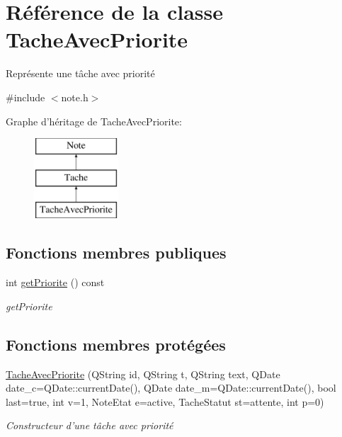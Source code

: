 \hypertarget{class_tache_avec_priorite}{\section{Référence de la classe Tache\-Avec\-Priorite}
\label{class_tache_avec_priorite}
}


Représente une tâche avec priorité  




{\ttfamily \#include $<$note.\-h$>$}

Graphe d'héritage de Tache\-Avec\-Priorite\-:\begin{figure}[H]
\begin{center}
\leavevmode
\includegraphics[height=3.000000cm]{class_tache_avec_priorite}
\end{center}
\end{figure}
\subsection*{Fonctions membres publiques}
\begin{DoxyCompactItemize}
\item 
int \hyperlink{class_tache_avec_priorite_ab932dc1d71765a1e124d2a398248ee6c}{get\-Priorite} () const 
\begin{DoxyCompactList}\small\item\em get\-Priorite \end{DoxyCompactList}\end{DoxyCompactItemize}
\subsection*{Fonctions membres protégées}
\begin{DoxyCompactItemize}
\item 
\hyperlink{class_tache_avec_priorite_a4ef6dcacb0c6837227fae4e96718a40b}{Tache\-Avec\-Priorite} (Q\-String id, Q\-String t, Q\-String text, Q\-Date date\-\_\-c=Q\-Date\-::current\-Date(), Q\-Date date\-\_\-m=Q\-Date\-::current\-Date(), bool last=true, int v=1, Note\-Etat e=active, Tache\-Statut st=attente, int p=0)
\begin{DoxyCompactList}\small\item\em Constructeur d'une tâche avec priorité \end{DoxyCompactList}\end{DoxyCompactItemize}
